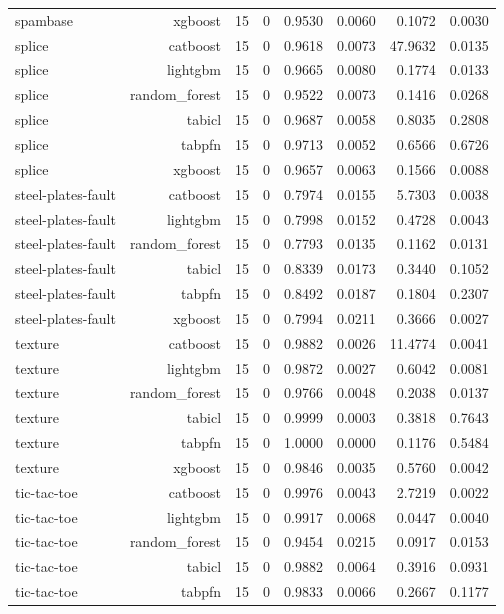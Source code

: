 \begin{table}[htbp]
\begin{tabular}{lrrrrrrr}
spambase & xgboost & 15 & 0 & 0.9530 & 0.0060 & 0.1072 & 0.0030 \\
splice & catboost & 15 & 0 & 0.9618 & 0.0073 & 47.9632 & 0.0135 \\
splice & lightgbm & 15 & 0 & 0.9665 & 0.0080 & 0.1774 & 0.0133 \\
splice & random\_forest & 15 & 0 & 0.9522 & 0.0073 & 0.1416 & 0.0268 \\
splice & tabicl & 15 & 0 & 0.9687 & 0.0058 & 0.8035 & 0.2808 \\
splice & tabpfn & 15 & 0 & 0.9713 & 0.0052 & 0.6566 & 0.6726 \\
splice & xgboost & 15 & 0 & 0.9657 & 0.0063 & 0.1566 & 0.0088 \\
steel-plates-fault & catboost & 15 & 0 & 0.7974 & 0.0155 & 5.7303 & 0.0038 \\
steel-plates-fault & lightgbm & 15 & 0 & 0.7998 & 0.0152 & 0.4728 & 0.0043 \\
steel-plates-fault & random\_forest & 15 & 0 & 0.7793 & 0.0135 & 0.1162 & 0.0131 \\
steel-plates-fault & tabicl & 15 & 0 & 0.8339 & 0.0173 & 0.3440 & 0.1052 \\
steel-plates-fault & tabpfn & 15 & 0 & 0.8492 & 0.0187 & 0.1804 & 0.2307 \\
steel-plates-fault & xgboost & 15 & 0 & 0.7994 & 0.0211 & 0.3666 & 0.0027 \\
texture & catboost & 15 & 0 & 0.9882 & 0.0026 & 11.4774 & 0.0041 \\
texture & lightgbm & 15 & 0 & 0.9872 & 0.0027 & 0.6042 & 0.0081 \\
texture & random\_forest & 15 & 0 & 0.9766 & 0.0048 & 0.2038 & 0.0137 \\
texture & tabicl & 15 & 0 & 0.9999 & 0.0003 & 0.3818 & 0.7643 \\
texture & tabpfn & 15 & 0 & 1.0000 & 0.0000 & 0.1176 & 0.5484 \\
texture & xgboost & 15 & 0 & 0.9846 & 0.0035 & 0.5760 & 0.0042 \\
tic-tac-toe & catboost & 15 & 0 & 0.9976 & 0.0043 & 2.7219 & 0.0022 \\
tic-tac-toe & lightgbm & 15 & 0 & 0.9917 & 0.0068 & 0.0447 & 0.0040 \\
tic-tac-toe & random\_forest & 15 & 0 & 0.9454 & 0.0215 & 0.0917 & 0.0153 \\
tic-tac-toe & tabicl & 15 & 0 & 0.9882 & 0.0064 & 0.3916 & 0.0931 \\
tic-tac-toe & tabpfn & 15 & 0 & 0.9833 & 0.0066 & 0.2667 & 0.1177 \\

\end{tabular}
\end{table}
